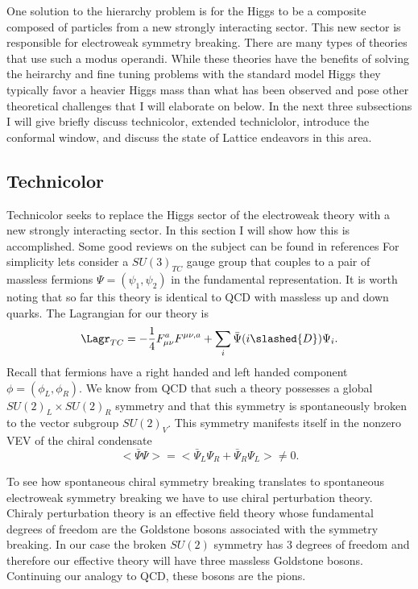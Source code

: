 
One solution to the hierarchy problem is for the Higgs to be a composite composed of particles from a new strongly interacting sector.
This new sector is responsible for electroweak symmetry breaking.
There are many types of theories that use such a modus operandi.
While these theories have the benefits of solving the heirarchy and fine tuning problems with the standard model Higgs they typically favor a heavier Higgs mass than what has been observed and pose other theoretical challenges that I will elaborate on below.
In the next three subsections I will give briefly discuss technicolor, extended techniclolor, introduce the conformal window, and discuss the state of Lattice endeavors in this area.

\subsection{Technicolor}

Technicolor seeks to replace the Higgs sector of the electroweak theory with a new strongly interacting sector.
In this section I will show how this is accomplished.
Some good reviews on the subject can be found in references \cite{ds 93-98}
For simplicity lets consider a $SU(3)_{TC}$ gauge group that couples to a pair of massless fermions $\Psi=(\psi_1,\psi_2)$ in the fundamental representation.
It is worth noting that so far this theory is identical to QCD with massless up and down quarks.
The Lagrangian for our theory is
\begin{equation}
  \begin{aligned}
    \Lagr_{TC}=-\frac{1}{4}F^a_{\mu\nu}F^{\mu\nu,a}+\sum_i \bar{\Psi}(i\slashed{D})\Psi_i.
  \end{aligned}
\end{equation}
Recall that fermions have a right handed and left handed component $\phi=(\phi_L,\phi_R)$.
We know from QCD that such a theory possesses a global $SU(2)_L\times SU(2)_R$ symmetry and that this symmetry is spontaneously broken to the vector subgroup $SU(2)_V$.
This symmetry manifests itself in the nonzero VEV of the chiral condensate
\begin{equation}
  <\bar{\Psi}\Psi>=<\bar{\Psi}_L\Psi_R+\bar{\Psi}_R\Psi_L>\neq 0.
\end{equation}

To see how spontaneous chiral symmetry breaking translates to spontaneous electroweak symmetry breaking we have to use chiral perturbation theory.
Chiraly perturbation theory is an effective field theory whose fundamental degrees of freedom are the Goldstone bosons associated with the symmetry breaking.
In our case the broken $SU(2)$ symmetry has 3 degrees of freedom and therefore our effective theory will have three massless Goldstone bosons.
Continuing our analogy to QCD, these bosons are the pions.


